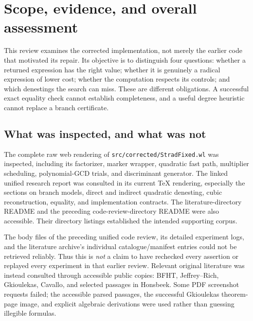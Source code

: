 \documentclass[11pt,letterpaper]{article}
\newcommand{\code}[1]{\texttt{#1}}
\theoremstyle{definition}
\begin{document}
\tableofcontents
\clearpage
{}

\section{Scope, evidence, and overall assessment}\label{sec:scope}

This review examines the corrected implementation, not merely the earlier code that motivated its repair. Its objective is to distinguish four questions: whether a returned expression has the right value; whether it is genuinely a radical expression of lower cost; whether the computation respects its controls; and which denestings the search can miss. These are different obligations. A successful exact equality check cannot establish completeness, and a useful degree heuristic cannot replace a branch certificate.

\subsection{What was inspected, and what was not}

The complete raw web rendering of \code{src/corrected/StradFixed.wl} was inspected, including its factorizer, marker wrapper, quadratic fast path, multiplier scheduling, polynomial-GCD trials, and discriminant generator. The linked unified research report was consulted in its current TeX rendering, especially the sections on branch models, direct and indirect quadratic denesting, cubic reconstruction, equality, and implementation contracts. The literature-directory README and the preceding code-review-directory README were also accessible. Their directory listings established the intended supporting corpus.\cite{fixed,report,litdir,prior}

The body files of the preceding unified code review, its detailed experiment logs, and the literature archive's individual catalogue/manifest entries could not be retrieved reliably. Thus this is \emph{not} a claim to have rechecked every assertion or replayed every experiment in that earlier review. Relevant original literature was instead consulted through accessible public copies: BFHT, Jeffrey--Rich, Gkioulekas, Cavallo, and selected passages in Honsbeek. Some PDF screenshot requests failed; the accessible parsed passages, the successful Gkioulekas theorem-page image, and explicit algebraic derivations were used rather than guessing illegible formulas.\cite{bfht,jeffrey,gkioulekas,cavallo,honsbeek}
\end{document}
